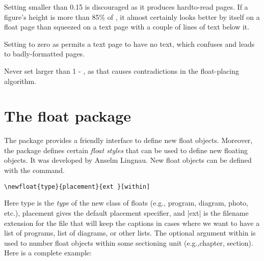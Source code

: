 \begin{macro}{\textfaction}
    Setting \textfraction smaller than 0.15 is discouraged as it produces hardto-read
    pages. If a figure’s height is more than 85\% of \cmd{\textheight}, it almost
    certainly looks better by itself on a float page than squeezed on a text page
    with a couple of lines of text below it.
    
    Setting  to zero as permits a text page to have
   no text, which confuses \latex and leads to badly-formatted pages.
\end{macro}
%
\begin{macro}{\topfraction}
Never set \cmd{\topfraction} larger than 1 - \cmd{\textfraction}, as that causes contradictions
in the float-placing algorithm.
\end{macro}


\begin{teXXX}
\renewcommand{\topfraction}{.85}
\renewcommand{\bottomfraction}{.7} %
\renewcommand{\textfraction}{.15}
\renewcommand{\floatpagefraction}{.7}
\renewcommand{\dbltopfraction}{.66}
\renewcommand{\dblfloatpagefraction}{.66}
\setcounter{topnumber}{9}
\setcounter{bottomnumber}{9}
\setcounter{totalnumber}{20}
\setcounter{dbltopnumber}{9}
\end{teXXX}

\section{The float package}
 
The  package provides a friendly interface to define new float objects. Moreover, the package
defines certain \emph{float styles} that can be used to define new floating objects.  It
was developed by Anselm Lingnau. New float objects can be defined with the command.

\begin{verbatim}
\newfloat{type}{placement}{ext }[within]
\end{verbatim}



Here type is the \emph{type}  of the new class of floats (e.g., program, diagram, photo, etc.),
placement gives the default placement specifier, and |ext| is the filename extension
for the file that will keep the captions in cases where we want to have a list of programs,
list of diagrams, or other lists. The optional argument within is used to number float
objects within some sectioning unit (e.g.,chapter, section). Here is a complete example:

